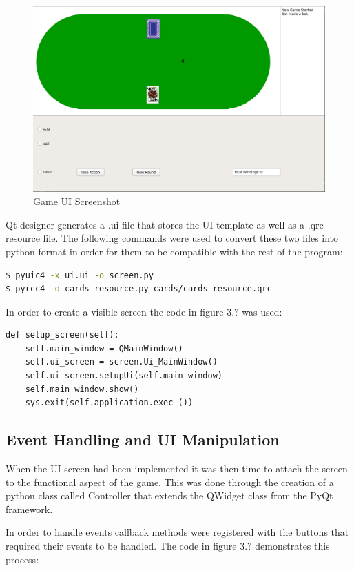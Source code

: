 \begin{figure}[ht]
    \includegraphics[scale=.4]{images/UI_screenshot.png}
    \caption{Game UI Screenshot}
\end{figure}

Qt designer generates a .ui file that stores the UI template as well as a .qrc resource file.
The following commands were used to convert these two files into python format in order for them
to be compatible with the rest of the program:
\begin{lstlisting}[language=bash]
$ pyuic4 -x ui.ui -o screen.py
$ pyrcc4 -o cards_resource.py cards/cards_resource.qrc
\end{lstlisting}

In order to create a visible screen the code in figure 3.? was used:
\begin{lstlisting}[style=Python]
def setup_screen(self):
    self.main_window = QMainWindow()
    self.ui_screen = screen.Ui_MainWindow()
    self.ui_screen.setupUi(self.main_window)
    self.main_window.show()
    sys.exit(self.application.exec_())
\end{lstlisting}

\subsection{Event Handling and UI Manipulation}\label{subsec:eventHandling}
When the UI screen had been implemented it was then time to attach the screen to the
functional aspect of the game.
This was done through the creation of a python class called Controller that extends the QWidget
class from the PyQt framework.

In order to handle events callback methods were registered with the buttons that required their events to be handled.
The code in figure 3.? demonstrates this process:

